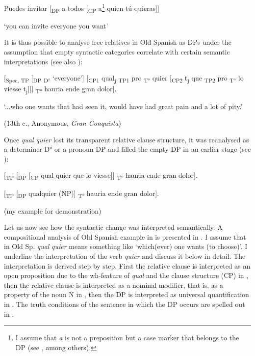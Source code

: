 \ea \label{ex:key:307} %
{  Puedes invitar [\textsubscript{DP} a todos [\textsubscript{CP} a}\footnote{{I assume that} {\textit{a}} {is not a preposition but a case marker that belongs to the DP (see \citealt{Lopez2000}, among others).}}{ quien tú quieras]]}

{  ‘you can invite everyone you want’}
\z

It is thus possible to analyse free relatives in Old Spanish as DPs under the assumption that empty syntactic categories correlate with certain semantic interpretations (see also \citealt{Rivero1988}):

\ea \label{ex:key:308} %
{  [\textsubscript{Spec, TP} [\textsubscript{DP} \textsubscript{D°} ‘everyone’] [\textsubscript{CP1} qual\textsubscript{j} \textsubscript{TP1} pro \textsubscript{T°} quier [\textsubscript{CP2} t\textsubscript{j} que \textsubscript{TP2} pro \textsubscript{T°} lo viesse t\textsubscript{j}]]] \textsubscript{T°} hauria ende gran dolor].}

  ‘...who one wants that had seen it, would have had great pain and a lot of pity.’

{  (13th c.,}{ }{Anonymous,} {\textit{Gran Conquista}}{)}
\z

Once \textit{qual quier} lost its transparent relative clause structure, it was reanalysed as a determiner D° or a pronoun DP and filled the empty DP in an earlier stage (see ):

\ea{} \label{ex:key:309} %
  [\textsubscript{TP} [\textsubscript{DP} [\textsubscript{CP} qual quier que lo viesse]] \textsubscript{T°} hauria ende gran dolor].

  [\textsubscript{TP} [\textsubscript{DP} qualquier (NP)] \textsubscript{T°} hauria ende gran dolor].

{  (my example for demonstration)}
\z

Let us now see how the syntactic change was interpreted semantically. A compositional analysis of Old Spanish example in  is presented in . I assume that in Old Sp. \textit{qual} \textit{quier} means something like ‘which(ever) one wants (to choose)’. I underline the interpretation of the verb \textit{quier} and discuss it below in detail. The interpretation is derived step by step. First the relative clause is interpreted as an open proposition due to the wh-feature of \textit{qual} and the clause structure (CP) in , then the relative clause is interpreted as a nominal modifier, that is, as a property of the noun N in , then the DP is interpreted as universal quantification in . The truth conditions of the sentence in which the DP occurs are spelled out in .

